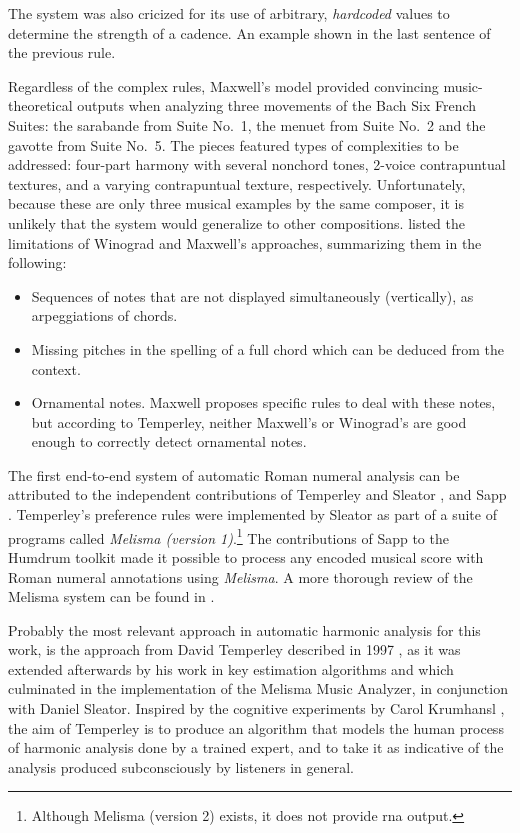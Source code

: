 The system was also cricized for its use of arbitrary,
\emph{hardcoded} values to determine the strength of a
cadence. An example shown in the last sentence of the
previous rule.

Regardless of the complex rules, Maxwell's model provided
convincing music-theoretical outputs when analyzing three
movements of the Bach Six French Suites: the sarabande from
Suite No.~1, the menuet from Suite No.~2 and the gavotte
from Suite No.~5. The pieces featured types of complexities
to be addressed: four-part harmony with several nonchord
tones, 2-voice contrapuntual textures, and a varying
contrapuntual texture, respectively. Unfortunately, because
these are only three musical examples by the same composer,
it is unlikely that the system would generalize to other
compositions. \textcite{temperley1997algorithm} listed the
limitations of Winograd and Maxwell's approaches,
summarizing them in the following:

\begin{itemize}
    \item Sequences of notes that are not displayed
    simultaneously (vertically), as arpeggiations of chords.
    \item Missing pitches in the spelling of a full chord
    which can be deduced from the context.
    \item Ornamental notes. Maxwell proposes specific rules
    to deal with these notes, but according to Temperley,
    neither Maxwell's or Winograd's are good enough to
    correctly detect ornamental notes.
\end{itemize}


The first end-to-end system of automatic Roman numeral
analysis can be attributed to the independent contributions
of Temperley and Sleator \parencite{temperley2004cognition},
and Sapp \parencite{sapp2009tsroot}. Temperley's preference
rules were implemented by Sleator as part of a suite of
programs called \emph{Melisma (version
1)}.\footnote{Although Melisma (version 2) exists, it does
not provide \gls{rna} output.} The contributions of Sapp to
the Humdrum toolkit \parencite{huron2002music} made it
possible to process any encoded musical score with Roman
numeral annotations using \emph{Melisma}. A more thorough
review of the Melisma system can be found in
\textcite{napoleslopez2017automatic}.

Probably the most relevant approach in automatic harmonic
analysis for this work, is the approach from David Temperley
described in 1997 \cite{temperley1997algorithm}, as it was
extended afterwards by his work in key estimation algorithms
and which culminated in the implementation of the Melisma
Music Analyzer, in conjunction with Daniel Sleator. Inspired
by the cognitive experiments by Carol Krumhansl
\cite{krumhansl2001cognitive}, the aim of Temperley is to
produce an algorithm that models the human process of
harmonic analysis done by a trained expert, and to take it
as indicative of the analysis produced subconsciously by
listeners in general.

